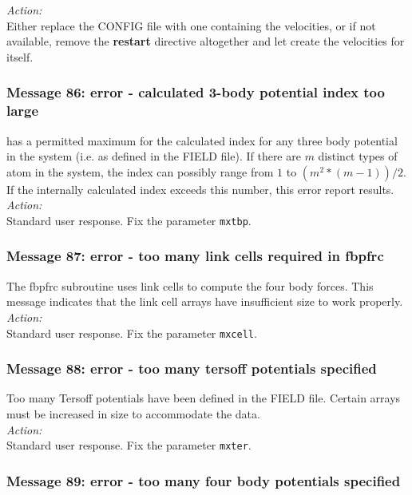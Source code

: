 \noindent
{\em Action:} \\ 
Either replace the CONFIG file with one containing the velocities, or
if not available, remove the {\bf restart} directive altogether 
and let \D{} create the velocities for itself.

\subsubsection*{Message 86: error - calculated
3-body  potential index
too large}

\D{} has a permitted maximum for the calculated index for any
three body  potential in the system (i.e. as defined in the FIELD
file). If there are $m$ distinct types of atom in the system, the
index can possibly range from $1$ to $(m^{2}*(m-1))/2$. If the
internally calculated index exceeds this number, this error report
results. \\

\noindent
{\em Action:} \\
Standard user response. Fix the parameter {\tt mxtbp}.

\subsubsection*{Message 87: error - too many link cells required in fbpfrc}

The {\sc fbpfrc} subroutine uses link cells to compute the four body
forces. This message indicates that the link cell arrays have
insufficient size to work properly.\\

\noindent
{\em Action:}\\
Standard user response. Fix the parameter {\tt mxcell}.

\subsubsection*{Message 88: error - too many tersoff potentials specified}

Too many Tersoff potentials  have been defined in the FIELD file.
Certain arrays must be increased in size to accommodate the data.\\

\noindent
{\em Action:}\\
Standard user response. Fix the parameter {\tt mxter}.

\subsubsection*{Message 89: error - too many four body potentials
specified}

